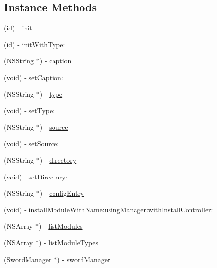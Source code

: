 \subsection*{Instance Methods}
\begin{DoxyCompactItemize}
\item 
(id) -\/ \hyperlink{interface_sword_install_source_a4213bb26f5207ee3f402fe463badc691}{init}
\item 
(id) -\/ \hyperlink{interface_sword_install_source_af085d1c1771f7b5b84153142e8c456c4}{init\-With\-Type\-:}
\item 
(N\-S\-String $\ast$) -\/ \hyperlink{interface_sword_install_source_a4cb180fe5df27d4bd273c04d92292737}{caption}
\item 
(void) -\/ \hyperlink{interface_sword_install_source_abc5563232d75e02a37664f88134d5684}{set\-Caption\-:}
\item 
(N\-S\-String $\ast$) -\/ \hyperlink{interface_sword_install_source_a1caf99cfa7869091592fa05b9dd76097}{type}
\item 
(void) -\/ \hyperlink{interface_sword_install_source_ad7a0a26a973868c166cfe3e452b3362e}{set\-Type\-:}
\item 
(N\-S\-String $\ast$) -\/ \hyperlink{interface_sword_install_source_a135f53ac05f1d84a8c71d97993524184}{source}
\item 
(void) -\/ \hyperlink{interface_sword_install_source_add5d42e48a130998069d1c357e22a776}{set\-Source\-:}
\item 
(N\-S\-String $\ast$) -\/ \hyperlink{interface_sword_install_source_a85c78fe7f92893506c9fda7c9639593a}{directory}
\item 
(void) -\/ \hyperlink{interface_sword_install_source_a52817b20c3b5e3833fb566fd10a65270}{set\-Directory\-:}
\item 
(N\-S\-String $\ast$) -\/ \hyperlink{interface_sword_install_source_a313541fdab30316ef367cb0dd80d0764}{config\-Entry}
\item 
(void) -\/ \hyperlink{interface_sword_install_source_af93862e0cc486e75fc8c98ff775c73da}{install\-Module\-With\-Name\-:using\-Manager\-:with\-Install\-Controller\-:}
\item 
(N\-S\-Array $\ast$) -\/ \hyperlink{interface_sword_install_source_abda52fffb7ad3591582d6e0b70e67b9c}{list\-Modules}
\item 
(N\-S\-Array $\ast$) -\/ \hyperlink{interface_sword_install_source_a2b84fd2d077d31d959eb988def4edc25}{list\-Module\-Types}
\item 
(\hyperlink{interface_sword_manager}{Sword\-Manager} $\ast$) -\/ \hyperlink{interface_sword_install_source_a4407c1f84a4dc61e063b6c9d2f553892}{sword\-Manager}
\end{DoxyCompactItemize}
